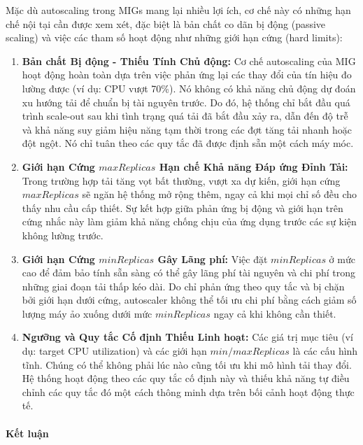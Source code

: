 Mặc dù autoscaling trong MIGs mang lại nhiều lợi ích, cơ chế này có những hạn chế nội tại cần được xem xét, đặc biệt là bản chất co dãn bị động (passive scaling) và việc các tham số hoạt động như những giới hạn cứng (hard limits):

\begin{enumerate}
    \item \textbf{Bản chất Bị động - Thiếu Tính Chủ động:} Cơ chế autoscaling của MIG hoạt động hoàn toàn dựa trên việc phản ứng lại các thay đổi của tín hiệu đo lường được (ví dụ: CPU vượt 70\%). Nó không có khả năng chủ động dự đoán xu hướng tải để chuẩn bị tài nguyên trước. Do đó, hệ thống chỉ bắt đầu quá trình scale-out sau khi tình trạng quá tải đã bắt đầu xảy ra, dẫn đến độ trễ và khả năng suy giảm hiệu năng tạm thời trong các đợt tăng tải nhanh hoặc đột ngột. Nó chỉ tuân theo các quy tắc đã được định sẵn một cách máy móc.

    \item \textbf{Giới hạn Cứng $maxReplicas$ Hạn chế Khả năng Đáp ứng Đỉnh Tải:} Trong trường hợp tải tăng vọt bất thường, vượt xa dự kiến, giới hạn cứng $maxReplicas$ sẽ ngăn hệ thống mở rộng thêm, ngay cả khi mọi chỉ số đều cho thấy nhu cầu cấp thiết. Sự kết hợp giữa phản ứng bị động và giới hạn trên cứng nhắc này làm giảm khả năng chống chịu của ứng dụng trước các sự kiện không lường trước.

    \item \textbf{Giới hạn Cứng $minReplicas$ Gây Lãng phí:} Việc đặt $minReplicas$ ở mức cao để đảm bảo tính sẵn sàng có thể gây lãng phí tài nguyên và chi phí trong những giai đoạn tải thấp kéo dài. Do chỉ phản ứng theo quy tắc và bị chặn bởi giới hạn dưới cứng, autoscaler không thể tối ưu chi phí bằng cách giảm số lượng máy ảo xuống dưới mức $minReplicas$ ngay cả khi không cần thiết.

    \item \textbf{Ngưỡng và Quy tắc Cố định Thiếu Linh hoạt:} Các giá trị mục tiêu (ví dụ: target CPU utilization) và các giới hạn $min/maxReplicas$ là các cấu hình tĩnh. Chúng có thể không phải lúc nào cũng tối ưu khi mô hình tải thay đổi. Hệ thống hoạt động theo các quy tắc cố định này và thiếu khả năng tự điều chỉnh các quy tắc đó một cách thông minh dựa trên bối cảnh hoạt động thực tế.
\end{enumerate}

\paragraph{Kết luận}

